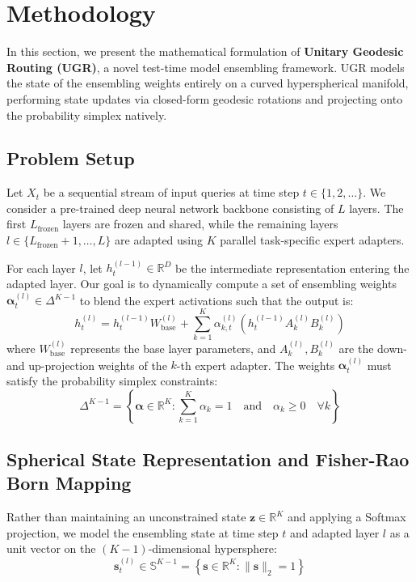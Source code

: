 \section{Methodology}
\label{sec:method}

In this section, we present the mathematical formulation of \textbf{Unitary Geodesic Routing (UGR)}, a novel test-time model ensembling framework. UGR models the state of the ensembling weights entirely on a curved hyperspherical manifold, performing state updates via closed-form geodesic rotations and projecting onto the probability simplex natively.

\subsection{Problem Setup}
Let $X_t$ be a sequential stream of input queries at time step $t \in \{1, 2, \dots\}$. We consider a pre-trained deep neural network backbone consisting of $L$ layers. The first $L_{\text{frozen}}$ layers are frozen and shared, while the remaining layers $l \in \{L_{\text{frozen}}+1, \dots, L\}$ are adapted using $K$ parallel task-specific expert adapters. 

For each layer $l$, let $h_t^{(l-1)} \in \mathbb{R}^D$ be the intermediate representation entering the adapted layer. Our goal is to dynamically compute a set of ensembling weights $\boldsymbol{\alpha}_t^{(l)} \in \Delta^{K-1}$ to blend the expert activations such that the output is:
\begin{equation}
h_t^{(l)} = h_t^{(l-1)} W_{\text{base}}^{(l)} + \sum_{k=1}^K \alpha_{k, t}^{(l)} \left( h_t^{(l-1)} A_k^{(l)} B_k^{(l)} \right)
\label{eq:forward}
\end{equation}
where $W_{\text{base}}^{(l)}$ represents the base layer parameters, and $A_k^{(l)}, B_k^{(l)}$ are the down- and up-projection weights of the $k$-th expert adapter. The weights $\boldsymbol{\alpha}_t^{(l)}$ must satisfy the probability simplex constraints:
\begin{equation}
\Delta^{K-1} = \left\{ \boldsymbol{\alpha} \in \mathbb{R}^K : \sum_{k=1}^K \alpha_k = 1 \quad \text{and} \quad \alpha_k \ge 0 \quad \forall k \right\}
\end{equation}

\subsection{Spherical State Representation and Fisher-Rao Born Mapping}
Rather than maintaining an unconstrained state $\mathbf{z} \in \mathbb{R}^K$ and applying a Softmax projection, we model the ensembling state at time step $t$ and adapted layer $l$ as a unit vector on the $(K-1)$-dimensional hypersphere:
\begin{equation}
\mathbf{s}_t^{(l)} \in \mathbb{S}^{K-1} = \left\{ \mathbf{s} \in \mathbb{R}^K : \|\mathbf{s}\|_2 = 1 \right\}
\end{equation}


